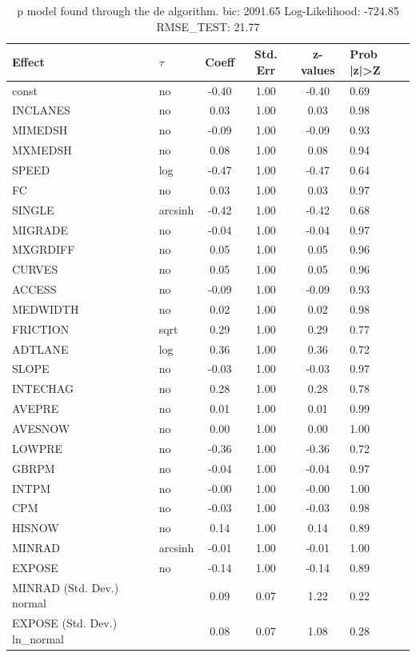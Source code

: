 \begin{table}
	\caption{p model found through the de algorithm. bic: 2091.65 Log-Likelihood: -724.85 RMSE_TEST: 21.77}
	\begin{center}
		\begin{tabular}{|l|l|c|c|c|l|}
			\hline
			Effect & $\tau$ & Coeff & Std. Err & z-values & Prob |z|>Z \\
			\hline
			const & no & -0.40 & 1.00 & -0.40 & 0.69 \\
			\hline
			INCLANES & no & 0.03 & 1.00 & 0.03 & 0.98 \\
			\hline
			MIMEDSH & no & -0.09 & 1.00 & -0.09 & 0.93 \\
			\hline
			MXMEDSH & no & 0.08 & 1.00 & 0.08 & 0.94 \\
			\hline
			SPEED & log & -0.47 & 1.00 & -0.47 & 0.64 \\
			\hline
			FC & no & 0.03 & 1.00 & 0.03 & 0.97 \\
			\hline
			SINGLE & arcsinh & -0.42 & 1.00 & -0.42 & 0.68 \\
			\hline
			MIGRADE & no & -0.04 & 1.00 & -0.04 & 0.97 \\
			\hline
			MXGRDIFF & no & 0.05 & 1.00 & 0.05 & 0.96 \\
			\hline
			CURVES & no & 0.05 & 1.00 & 0.05 & 0.96 \\
			\hline
			ACCESS & no & -0.09 & 1.00 & -0.09 & 0.93 \\
			\hline
			MEDWIDTH & no & 0.02 & 1.00 & 0.02 & 0.98 \\
			\hline
			FRICTION & sqrt & 0.29 & 1.00 & 0.29 & 0.77 \\
			\hline
			ADTLANE & log & 0.36 & 1.00 & 0.36 & 0.72 \\
			\hline
			SLOPE & no & -0.03 & 1.00 & -0.03 & 0.97 \\
			\hline
			INTECHAG & no & 0.28 & 1.00 & 0.28 & 0.78 \\
			\hline
			AVEPRE & no & 0.01 & 1.00 & 0.01 & 0.99 \\
			\hline
			AVESNOW & no & 0.00 & 1.00 & 0.00 & 1.00 \\
			\hline
			LOWPRE & no & -0.36 & 1.00 & -0.36 & 0.72 \\
			\hline
			GBRPM & no & -0.04 & 1.00 & -0.04 & 0.97 \\
			\hline
			INTPM & no & -0.00 & 1.00 & -0.00 & 1.00 \\
			\hline
			CPM & no & -0.03 & 1.00 & -0.03 & 0.98 \\
			\hline
			HISNOW & no & 0.14 & 1.00 & 0.14 & 0.89 \\
			\hline
			MINRAD & arcsinh & -0.01 & 1.00 & -0.01 & 1.00 \\
			\hline
			EXPOSE & no & -0.14 & 1.00 & -0.14 & 0.89 \\
			\hline
			MINRAD (Std. Dev.) normal &  & 0.09 & 0.07 & 1.22 & 0.22 \\
			\hline
			EXPOSE (Std. Dev.) ln_normal &  & 0.08 & 0.07 & 1.08 & 0.28 \\
			\hline
		\end{tabular}
	\end{center}
\end{table}